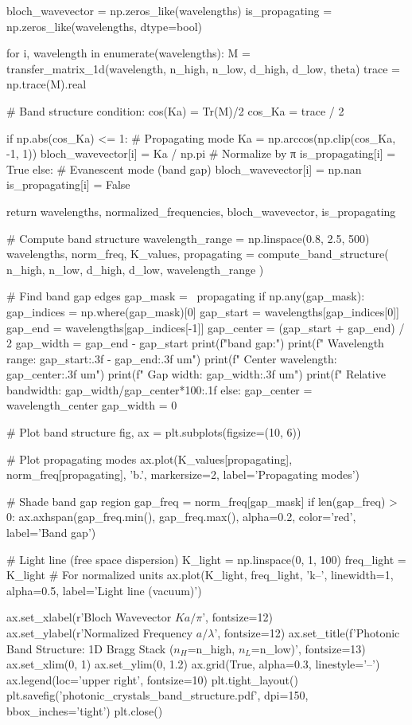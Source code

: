 \documentclass[11pt,a4paper]{article}
\begin{document}
\begin{pycode}
    bloch_wavevector = np.zeros_like(wavelengths)
    is_propagating = np.zeros_like(wavelengths, dtype=bool)

    for i, wavelength in enumerate(wavelengths):
        M = transfer_matrix_1d(wavelength, n_high, n_low, d_high, d_low, theta)
        trace = np.trace(M).real

        # Band structure condition: cos(Ka) = Tr(M)/2
        cos_Ka = trace / 2

        if np.abs(cos_Ka) <= 1:
            # Propagating mode
            Ka = np.arccos(np.clip(cos_Ka, -1, 1))
            bloch_wavevector[i] = Ka / np.pi  # Normalize by π
            is_propagating[i] = True
        else:
            # Evanescent mode (band gap)
            bloch_wavevector[i] = np.nan
            is_propagating[i] = False

    return wavelengths, normalized_frequencies, bloch_wavevector, is_propagating

# Compute band structure
wavelength_range = np.linspace(0.8, 2.5, 500)
wavelengths, norm_freq, K_values, propagating = compute_band_structure(
    n_high, n_low, d_high, d_low, wavelength_range
)

# Find band gap edges
gap_mask = ~propagating
if np.any(gap_mask):
    gap_indices = np.where(gap_mask)[0]
    gap_start = wavelengths[gap_indices[0]]
    gap_end = wavelengths[gap_indices[-1]]
    gap_center = (gap_start + gap_end) / 2
    gap_width = gap_end - gap_start
    print(f"\nPhotonic band gap:")
    print(f"  Wavelength range: {gap_start:.3f} - {gap_end:.3f} um")
    print(f"  Center wavelength: {gap_center:.3f} um")
    print(f"  Gap width: {gap_width:.3f} um")
    print(f"  Relative bandwidth: {gap_width/gap_center*100:.1f}%
else:
    gap_center = wavelength_center
    gap_width = 0

# Plot band structure
fig, ax = plt.subplots(figsize=(10, 6))

# Plot propagating modes
ax.plot(K_values[propagating], norm_freq[propagating], 'b.', markersize=2, label='Propagating modes')

# Shade band gap region
gap_freq = norm_freq[gap_mask]
if len(gap_freq) > 0:
    ax.axhspan(gap_freq.min(), gap_freq.max(), alpha=0.2, color='red', label='Band gap')

# Light line (free space dispersion)
K_light = np.linspace(0, 1, 100)
freq_light = K_light  # For normalized units
ax.plot(K_light, freq_light, 'k--', linewidth=1, alpha=0.5, label='Light line (vacuum)')

ax.set_xlabel(r'Bloch Wavevector $Ka/\pi$', fontsize=12)
ax.set_ylabel(r'Normalized Frequency $a/\lambda$', fontsize=12)
ax.set_title(f'Photonic Band Structure: 1D Bragg Stack ($n_H$={n_high}, $n_L$={n_low})', fontsize=13)
ax.set_xlim(0, 1)
ax.set_ylim(0, 1.2)
ax.grid(True, alpha=0.3, linestyle='--')
ax.legend(loc='upper right', fontsize=10)
plt.tight_layout()
plt.savefig('photonic_crystals_band_structure.pdf', dpi=150, bbox_inches='tight')
plt.close()
\end{pycode}
\end{document}
